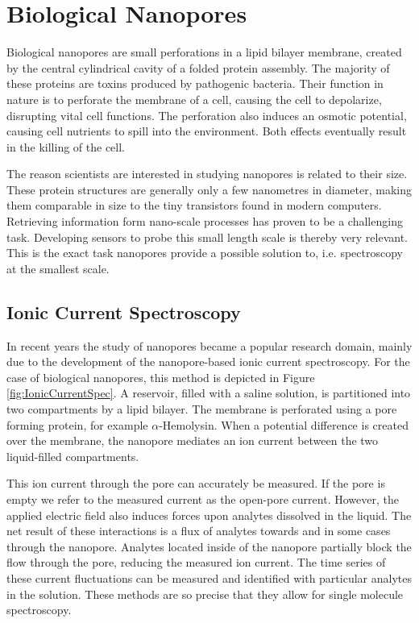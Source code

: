 \section{Biological Nanopores}

Biological nanopores are small perforations in a lipid bilayer membrane, created
by the central cylindrical cavity of a folded protein assembly. The majority of these
proteins are toxins produced by pathogenic bacteria. Their function in nature is to
perforate the membrane of a cell, causing the cell to depolarize, disrupting vital cell
functions. The perforation also induces an osmotic potential, causing cell nutrients to
spill into the environment. Both effects eventually result in the killing of the
cell.\cite{Peraro2016}

The reason scientists are interested in studying nanopores is related to their size.
These protein structures are generally only a few nanometres in diameter, making them
comparable in size to the tiny transistors found in modern computers. Retrieving
information form nano-scale processes has proven to be a challenging task. Developing
sensors to probe this small length scale is thereby very relevant. This is the exact task
nanopores provide a possible solution to, i.e. spectroscopy at the smallest
scale.

\subsection{Ionic Current Spectroscopy}

In recent years the study of nanopores became a popular research domain, mainly
due to the development of the nanopore-based ionic current spectroscopy. For the case of
biological nanopores, this method is depicted in Figure \ref{fig:IonicCurrentSpec}. A
reservoir, filled with a saline solution, is partitioned into two compartments by a
lipid bilayer. The membrane is perforated using a pore forming protein, for example
$\alpha$-Hemolysin.  When a potential difference is created over the membrane, the
nanopore mediates an ion current between the two liquid-filled compartments.

This ion current through the pore can accurately be measured. If the pore is empty we
refer to the measured current as the open-pore current. However, the applied electric
field also induces forces upon analytes dissolved in the liquid. The net result of these
interactions is a flux of analytes towards and in some cases through the nanopore.
Analytes located inside of the nanopore partially block the flow through the pore,
reducing the measured ion current. The time series of
these current fluctuations can be measured and identified with particular analytes in the
solution. These methods are so precise that they allow for single molecule
spectroscopy.\cite{Howorka2009}

